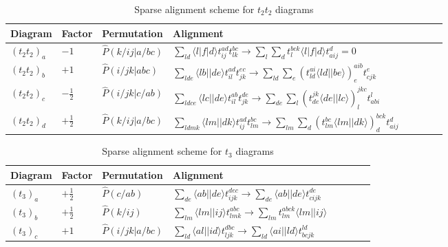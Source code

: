 \begin{table}[hbpt]
\centering
\caption{Sparse alignment scheme for $t_2 t_2$ diagrams}
\label{tab:sparse_alignments_t2t2}
\begin{tabular}{llllllll}
Diagram  & Factor & Permutation & Alignment   \\ \hline
$(t_2 t_2)_a$&$-1$&$\hat{P}(k/ij \vert a/bc)$&$  \sum_{ld} \langle l \vert f \vert d \rangle t^{a d}_{i j}t^{b c}_{l k}  \rightarrow  \sum_{l} \sum_{d} t^{bck}_{l} \langle l\vert f \vert d\rangle t^{d}_{aij} = 0$ \\
$(t_2 t_2)_b$&$+1$&$\hat{P}(i/jk \vert abc)$&$  \sum_{lde} \langle l b \vert \vert d e \rangle t^{a d}_{i l}t^{e c}_{j k}  \rightarrow  \sum_{ld} \sum_{e} (t^{ai}_{ld} \langle ld\vert \vert be\rangle)^{aib}_e t^{e}_{cjk}  $\\
$(t_2 t_2)_c$&$-\frac{1}{2}$&$\hat{P}(i/jk \vert c/ab)$&$  \sum_{ldce} \langle l c \vert \vert d e \rangle t^{a b}_{i l}t^{d e}_{j k}  \rightarrow  \sum_{de} \sum_{l} (t^{jk}_{de} \langle de\vert \vert lc\rangle)^{jkc}_l t^{l}_{abi} $ \\
$(t_2 t_2)_d$&$+\frac{1}{2}$&$\hat{P}(k/ij \vert a/bc)$&$  \sum_{ldmk} \langle l m \vert \vert d k \rangle t^{a d}_{i j}t^{b c}_{l m}  \rightarrow  \sum_{lm} \sum_{d} (t^{bc}_{lm} \langle lm\vert \vert dk\rangle)^{bck}_d t^{d}_{aij} $ \\
\end{tabular}
\end{table}



\begin{table}[hbpt]
\centering
\caption{Sparse alignment scheme for $t_3$ diagrams}
\label{tab:sparse_alignments_t3}
\begin{tabular}{llllllll}
Diagram  & Factor & Permutation & Alignment  \\ \hline
$(t_3)_a$ & $+\frac{1}{2}$ & $\hat{P}(c/ab)$ & $\sum_{de} \langle ab \vert \vert de \rangle t^{dec}_{ijk} \rightarrow \sum_{de} \langle ab \vert \vert de \rangle t^{de}_{cijk}$  \\
$(t_3)_b$&$+\frac{1}{2}$& $\hat{P}(k/ij)$& $\sum_{lm} \langle lm \vert \vert ij \rangle t^{abc}_{lmk} \rightarrow \sum_{lm} t^{abck}_{lm} \langle lm \vert \vert ij \rangle $ \\
$(t_3)_c$&$+1$& $\hat{P}(i/jk \vert a/bc)$ & $\sum_{ld} \langle al \vert \vert id \rangle t^{dbc}_{ljk} \rightarrow \sum_{ld} \langle ai \vert \vert ld \rangle t^{ld}_{bcjk}$ \\
\end{tabular}
\end{table}







